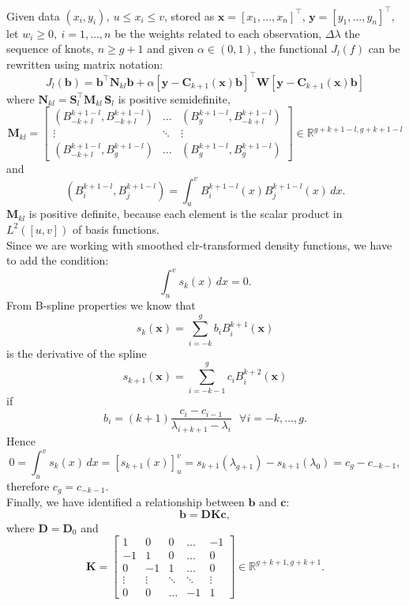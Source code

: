 Given data $(x_i,y_i), \ u\le x_i \le v$, stored as $\textbf{x} = [x_1, \dots, x_n]^\top$, $\textbf{y} = [y_1, \dots, y_n]^\top$, let $w_i \ge 0, \ i=1, \dots, n$ be the weights related to each observation, $\Delta\lambda$ the sequence of knots, $n \ge g+1 $ and given $\alpha \in (0,1)$, the functional $J_l(f)$ can be rewritten using matrix notation:
\[J_l(\textbf{b}) = \textbf{b}^\top \textbf{N}_{kl}\textbf{b} + \alpha [\textbf{y}-\textbf{C}_{k+1}(\textbf{x})\textbf{b}]^\top \textbf{W} [\textbf{y}-\textbf{C}_{k+1}(\textbf{x})\textbf{b}]\]
where $\textbf{N}_{kl} =  \textbf{S}_l^\top \textbf{M}_{kl} \, \textbf{S}_l$ is positive semidefinite, 
\[  \textbf{M}_{kl} =
\begin{bmatrix}
(B_{-k+l}^{k+1-l}, B_{-k+l}^{k+1-l}) & \dots  & (B_{g}^{k+1-l}, B_{-k+l}^{k+1-l}) \\
\vdots & \ddots & \vdots \\
(B_{-k+l}^{k+1-l}, B_{g}^{k+1-l}) &  \dots  & (B_{g}^{k+1-l}, B_{g}^{k+1-l})
\end{bmatrix} \in \mathbb{R}^{g+k+1-l, g+k+1-l} \]
and \[(B_{i}^{k+1-l}, B_{j}^{k+1-l}) = \int_u^v B_{i}^{k+1-l}(x)B_{j}^{k+1-l}(x) \, dx.\]
$\textbf{M}_{kl}$ is positive definite, because each element is the scalar product in $L^2([u,v])$ of basis functions. \\
Since we are working with smoothed clr-transformed density functions, we have to add the condition:
\[\int_u^v s_k(x) \, dx = 0.\] 
From B-spline properties we know that 
\[  s_k(\textbf{x})=\sum\limits_{i=-k}^{g}b_iB_i^{k+1}(\textbf{x}) \]
is the derivative of the spline
\[  s_{k+1}(\textbf{x})=\sum\limits_{i=-k-1}^{g}c_iB_i^{k+2}(\textbf{x}) \]
if
\[b_i = (k+1)\frac{c_i-c_{i-1}}{\lambda_{i+k+1}-\lambda_{i}}\ \ \  \forall i = -k, \dots, g.\]
Hence 
\[ 0 = \int_u^v s_k(x) \, dx = [s_{k+1}(x)]_u^v = s_{k+1}(\lambda_{g+1})-s_{k+1}(\lambda_{0}) = c_g-c_{-k-1},\]
therefore $c_g = c_{-k-1}$.\\
Finally, we have identified a relationship between $\textbf{b}$ and $\textbf{c}$:
\[\textbf{b} = \textbf{D}\textbf{K}\textbf{c},\] 
where $ \textbf{D} = \textbf{D}_0$ and
\[  \textbf{K} =
\begin{bmatrix}
1 &0&0& \dots  & -1 \\
-1 &1&0& \dots  & 0 \\
0 &-1&1& \dots  & 0 \\
\vdots &\vdots & \ddots & \ddots& \vdots \\
0 &0 & \dots&-1  & 1
\end{bmatrix} \in \mathbb{R}^{g+k+1, g+k+1}. \]
